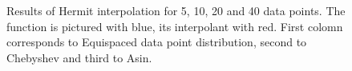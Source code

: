 \documentclass[10pt]{article}
\begin{document}
\begin{figure}[H]
\begin{minipage}[h]{0.34\linewidth}
		\end{minipage}%
		\begin{minipage}[h]{0.34\linewidth}
		\end{minipage}%
		\caption{Results of Hermit interpolation for 5, 10, 20 and 40 data points. The function is pictured with blue, its interpolant with red. First colomn corresponds to Equispaced data point distribution, second to Chebyshev and third to Asin.}
	\end{figure}
	\newpage
\end{document}
